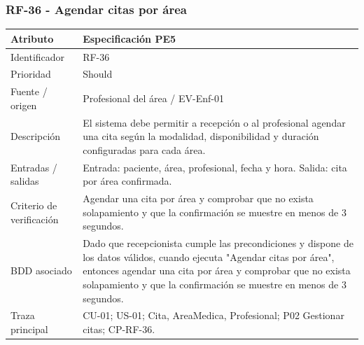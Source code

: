 \documentclass[11pt,a4paper]{article}
\begin{document}
	\subsubsection{RF-36 - Agendar citas por área}
	\begin{tabularx}{\textwidth}{p{3.2cm}Y}
		\toprule
		\textbf{Atributo} & \textbf{Especificación PE5}\\\midrule
		Identificador & RF-36\\
		Prioridad & Should\\
		Fuente / origen & Profesional del área / EV-Enf-01\\
		Descripción & El sistema debe permitir a recepción o al profesional agendar una cita según la modalidad, disponibilidad y duración configuradas para cada área.\\
		Entradas / salidas & Entrada: paciente, área, profesional, fecha y hora. Salida: cita por área confirmada.\\
		Criterio de verificación & Agendar una cita por área y comprobar que no exista solapamiento y que la confirmación se muestre en menos de 3 segundos.\\
		BDD asociado & Dado que recepcionista cumple las precondiciones y dispone de los datos válidos, cuando ejecuta "Agendar citas por área", entonces agendar una cita por área y comprobar que no exista solapamiento y que la confirmación se muestre en menos de 3 segundos.\\
		Traza principal & CU-01; US-01; Cita, AreaMedica, Profesional; P02 Gestionar citas; CP-RF-36.\\
		\bottomrule
	\end{tabularx}
	\clearpage
\end{document}
